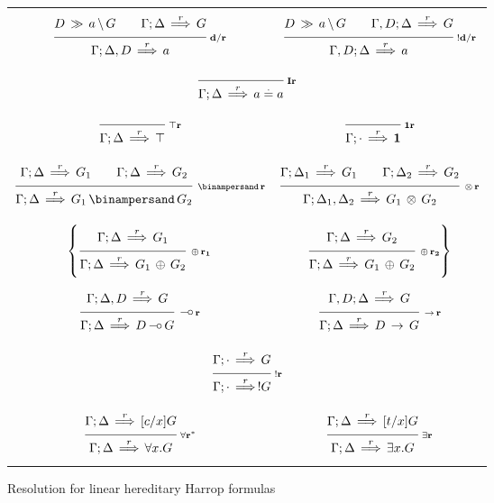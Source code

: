 \tableofcontents

\listoffigures

\newpage
\setcounter{page}{1}
\renewcommand{\thepage}{\arabic{page}}

\begin{figure}[t]
  \begin{center}
    \leavevmode

    \begin{tabular}{|cc|}
      \hline &\\
      $\ruleII
        {\decd{D}{a}{G}}
        {\resd{\G;\D}{G}}
        {\resd{\G;\D,D}{a}}
        {d/r}$
      &
      $\ruleII
        {\decd{D}{a}{G}}
        {\resd{\G,D;\D}{G}}
        {\resd{\G,D;\D}{a}}
        {!d/r}$
      \\
      \multicolumn{2}{|c|}{
        $\ruleI
          {}
          {\resd{\G;\D}{\eq{a}{a}}}
          {I r}$}
      \\

      $\ruleI
        {}
        {\resd{\G;\D}{\Top}}
        {\Top r}$
      &
      $\ruleI
        {}
        {\resd{\G;\cdot}{\One}}
        {\One r}$
      \\&\\

      $\ruleII
        {\resd{\G;\D}{G_1}}
        {\resd{\G;\D}{G_2}}
        {\resd{\G;\D}{G_1 \With G_2}}
        {\With r}$
      &
      $\ruleII
        {\resd{\G;\D_1}{G_1}}
        {\resd{\G;\D_2}{G_2}}
        {\resd{\G;\D_1,\D_2}{G_1 \Times G_2}}
        {\Times r}$
      \\&\\

      $\left\{
        \ruleI
          {\resd{\G;\D}{G_1}}
          {\resd{\G;\D}{G_1 \Plus G_2}}
          {\Plus r_1}
      \right.$
      &
      $\left.
        \ruleI
          {\resd{\G;\D}{G_2}}
          {\resd{\G;\D}{G_1 \Plus G_2}}
          {\Plus r_2}
      \right\}$
      \\&\\

      $\ruleI
        {\resd{\G;\D,D}{G}}
        {\resd{\G;\D}{D \Lolli G}}
        {\Lolli r}$
      &
      $\ruleI
        {\resd{\G,D;\D}{G}}
        {\resd{\G;\D}{D \Imp G}}
        {\Imp r}$
      \\&\\
      \multicolumn{2}{|c|}{
        $\ruleI
          {\resd{\G;\cdot}{G}}
          {\resd{\G;\cdot}{!G}}
          {! r}$}
      \\&\\

      $\ruleI
        {\resd{\G;\D}{[c/x]G}}
        {\resd{\G;\D}{\A x. G}}
        {\A r^*}$
      &
      $\ruleI
        {\resd{\G;\D}{[t/x]G}}
        {\resd{\G;\D}{\E x. G}}
        {\E r}$
      \\
      \hline
    \end{tabular}

    \caption{Resolution for linear hereditary Harrop formulas}
    \label{fig:Resolution1}
  \end{center}
\end{figure}
\hspace*{1em}

